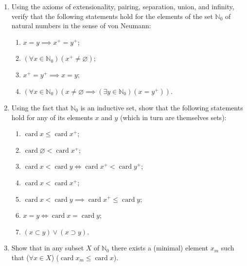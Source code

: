 \begin{exercise}
    \begin{enumerate}[label={(\alph*)}]
        \item Using the axioms of extensionality, pairing, separation, union, and infinity, verify that the following statements hold for the elements of the set $\mathbb{N}_{0}$ of natural numbers in the sense of von Neumann:
              \begin{enumerate}[label={${\arabic*}^{0}$}]
                  \item $x = y\implies x^{+} = y^{+}$;
                  \item $(\forall x\in\mathbb{N}_{0})(x^{+}\ne \varnothing)$;
                  \item $x^{+} = y^{+} \implies x = y$;
                  \item $(\forall x\in\mathbb{N}_{0})(x \ne \varnothing \implies (\exists y\in \mathbb{N}_{0})(x = y^{+}))$.
              \end{enumerate}
        \item Using the fact that $\mathbb{N}_{0}$ is an inductive set, show that the following statements hold for any of its elements $x$ and $y$ (which in turn are themselves sets):
              \begin{enumerate}[label={${\arabic*}^{0}$}]
                  \item $\operatorname{card} x\leq \operatorname{card} x^{+}$;
                  \item $\operatorname{card} \varnothing < \operatorname{card} x^{+}$;
                  \item $\operatorname{card} x < \operatorname{card} y \Leftrightarrow \operatorname{card} x^{+} < \operatorname{card} y^{+}$;
                  \item $\operatorname{card} x < \operatorname{card} x^{+}$;
                  \item $\operatorname{card} x < \operatorname{card} y \implies \operatorname{card} x^{+} \leq \operatorname{card} y$;
                  \item $x = y \Leftrightarrow \operatorname{card} x = \operatorname{card} y$;
                  \item $(x\subset y)\lor (x\supset y)$.
              \end{enumerate}
        \item Show that in any subset $X$ of $\mathbb{N}_{0}$ there exists a (minimal) element $x_{m}$ such that ($\forall x\in X$) ($\operatorname{card} x_{m}\leq \operatorname{card} x$).
    \end{enumerate}
\end{exercise}

